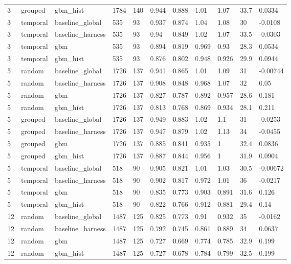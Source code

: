 \begin{tabular}{lllllllllll}
3 & grouped & gbm\_hist & 1784 & 140 & 0.944 & 0.888 & 1.01 & 1.07 & 33.7 & 0.0334 \\
3 & temporal & baseline\_global & 535 & 93 & 0.937 & 0.874 & 1.04 & 1.08 & 30 & -0.0108 \\
3 & temporal & baseline\_harness & 535 & 93 & 0.94 & 0.849 & 1.02 & 1.07 & 33.5 & -0.0303 \\
3 & temporal & gbm & 535 & 93 & 0.894 & 0.819 & 0.969 & 0.93 & 28.3 & 0.0534 \\
3 & temporal & gbm\_hist & 535 & 93 & 0.876 & 0.802 & 0.948 & 0.926 & 29.9 & 0.0944 \\
5 & random & baseline\_global & 1726 & 137 & 0.941 & 0.865 & 1.01 & 1.09 & 31 & -0.00744 \\
5 & random & baseline\_harness & 1726 & 137 & 0.908 & 0.848 & 0.968 & 1.07 & 32 & 0.05 \\
5 & random & gbm & 1726 & 137 & 0.827 & 0.787 & 0.892 & 0.957 & 28.6 & 0.181 \\
5 & random & gbm\_hist & 1726 & 137 & 0.813 & 0.768 & 0.869 & 0.934 & 28.1 & 0.211 \\
5 & grouped & baseline\_global & 1726 & 137 & 0.949 & 0.883 & 1.02 & 1.1 & 31 & -0.0253 \\
5 & grouped & baseline\_harness & 1726 & 137 & 0.947 & 0.879 & 1.02 & 1.13 & 34 & -0.0455 \\
5 & grouped & gbm & 1726 & 137 & 0.885 & 0.841 & 0.935 & 1 & 32.4 & 0.0836 \\
5 & grouped & gbm\_hist & 1726 & 137 & 0.887 & 0.844 & 0.956 & 1 & 31.9 & 0.0904 \\
5 & temporal & baseline\_global & 518 & 90 & 0.905 & 0.821 & 1.01 & 1.03 & 30.5 & -0.00672 \\
5 & temporal & baseline\_harness & 518 & 90 & 0.902 & 0.817 & 0.972 & 1.01 & 36 & -0.0217 \\
5 & temporal & gbm & 518 & 90 & 0.835 & 0.773 & 0.903 & 0.891 & 31.6 & 0.126 \\
5 & temporal & gbm\_hist & 518 & 90 & 0.822 & 0.766 & 0.912 & 0.881 & 29.4 & 0.14 \\
12 & random & baseline\_global & 1487 & 125 & 0.825 & 0.773 & 0.91 & 0.932 & 35 & -0.0162 \\
12 & random & baseline\_harness & 1487 & 125 & 0.792 & 0.745 & 0.861 & 0.889 & 34 & 0.0637 \\
12 & random & gbm & 1487 & 125 & 0.727 & 0.669 & 0.774 & 0.785 & 32.9 & 0.199 \\
12 & random & gbm\_hist & 1487 & 125 & 0.727 & 0.678 & 0.784 & 0.799 & 32.5 & 0.199 \\

\end{tabular}
